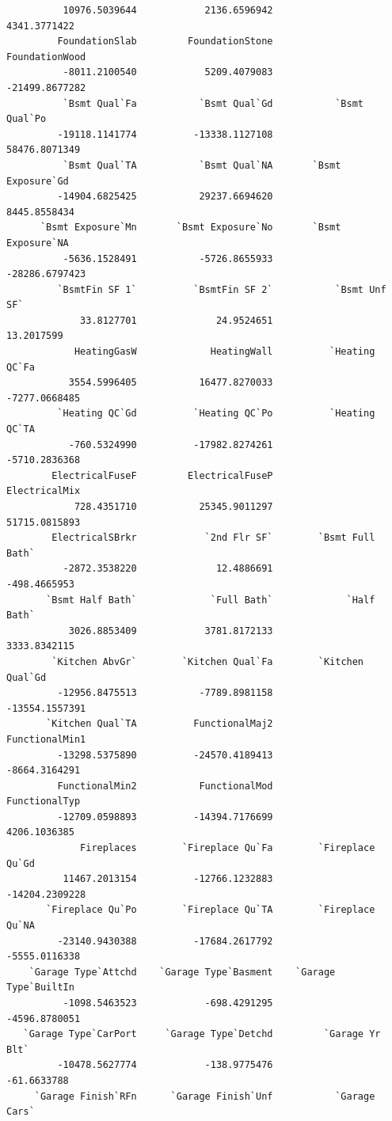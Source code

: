\documentclass[
  letterpaper,
  DIV=11,
  numbers=noendperiod]{scrreprt}
\begin{document}
\begin{verbatim}
          10976.5039644            2136.6596942            4341.3771422 
         FoundationSlab         FoundationStone          FoundationWood 
          -8011.2100540            5209.4079083          -21499.8677282 
          `Bsmt Qual`Fa           `Bsmt Qual`Gd           `Bsmt Qual`Po 
         -19118.1141774          -13338.1127108           58476.8071349 
          `Bsmt Qual`TA           `Bsmt Qual`NA       `Bsmt Exposure`Gd 
         -14904.6825425           29237.6694620            8445.8558434 
      `Bsmt Exposure`Mn       `Bsmt Exposure`No       `Bsmt Exposure`NA 
          -5636.1528491           -5726.8655933          -28286.6797423 
         `BsmtFin SF 1`          `BsmtFin SF 2`           `Bsmt Unf SF` 
             33.8127701              24.9524651              13.2017599 
            HeatingGasW             HeatingWall          `Heating QC`Fa 
           3554.5996405           16477.8270033           -7277.0668485 
         `Heating QC`Gd          `Heating QC`Po          `Heating QC`TA 
           -760.5324990          -17982.8274261           -5710.2836368 
        ElectricalFuseF         ElectricalFuseP           ElectricalMix 
            728.4351710           25345.9011297           51715.0815893 
        ElectricalSBrkr            `2nd Flr SF`        `Bsmt Full Bath` 
          -2872.3538220              12.4886691            -498.4665953 
       `Bsmt Half Bath`             `Full Bath`             `Half Bath` 
           3026.8853409            3781.8172133            3333.8342115 
        `Kitchen AbvGr`        `Kitchen Qual`Fa        `Kitchen Qual`Gd 
         -12956.8475513           -7789.8981158          -13554.1557391 
       `Kitchen Qual`TA          FunctionalMaj2          FunctionalMin1 
         -13298.5375890          -24570.4189413           -8664.3164291 
         FunctionalMin2           FunctionalMod           FunctionalTyp 
         -12709.0598893          -14394.7176699            4206.1036385 
             Fireplaces        `Fireplace Qu`Fa        `Fireplace Qu`Gd 
          11467.2013154          -12766.1232883          -14204.2309228 
       `Fireplace Qu`Po        `Fireplace Qu`TA        `Fireplace Qu`NA 
         -23140.9430388          -17684.2617792           -5555.0116338 
    `Garage Type`Attchd    `Garage Type`Basment    `Garage Type`BuiltIn 
          -1098.5463523            -698.4291295           -4596.8780051 
   `Garage Type`CarPort     `Garage Type`Detchd         `Garage Yr Blt` 
         -10478.5627774            -138.9775476             -61.6633788 
     `Garage Finish`RFn      `Garage Finish`Unf           `Garage Cars` 

\end{verbatim}
\end{document}

